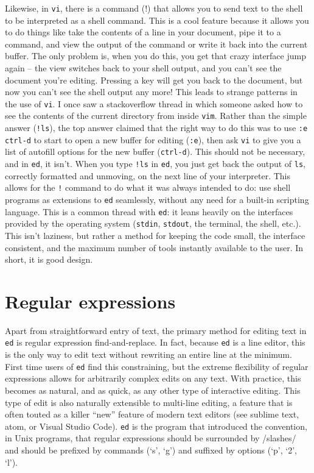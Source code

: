 \documentclass[12pt]{article}
\begin{document}
Likewise, in \lstinline{vi}, there is a command (!) that allows you
to send text to the shell to be interpreted as a shell command.
This is a cool feature because it allows you to do things like
take the contents of a line in your document, pipe it to a command,
and view the output of the command or write it back into the current buffer.
The only problem is, when you do this, you get that crazy interface jump
again -- the view switches back to your shell output, and you can't see
the document you're editing. Pressing a key will get you back to the document,
but now you can't see the shell output any more! This leads to strange
patterns in the use of \lstinline{vi}. I once saw a stackoverflow thread
in which someone asked how to see the contents of the current directory from
inside \lstinline{vim}. Rather than the simple answer (\lstinline{!ls}), the
top answer claimed that the right way to do this was to use \lstinline{:e ctrl-d}
to start to open a new buffer for editing (\lstinline{:e}), then ask \lstinline{vi}
to give you a list of autofill options for the new buffer (\lstinline{ctrl-d}).
This should not be necessary, and in \lstinline{ed}, it isn't. When you type
\lstinline{!ls} in \lstinline{ed}, you just get back 
the output of \lstinline{ls}, correctly formatted and unmoving, on the next
line of your interpreter. This allows for the \lstinline{!} command to do what
it was always intended to do: use shell programs as extensions to \lstinline{ed}
seamlessly, without any need for a built-in scripting language.
This is a common thread with \lstinline{ed}: it leans heavily on the interfaces provided
by the operating system (\lstinline{stdin}, \lstinline{stdout}, the terminal, the shell, etc.).
This isn't laziness, but rather a method for keeping the code small, the interface consistent,
and the maximum number of tools instantly available to the user. In short, it is good design.

\section{Regular expressions}

Apart from straightforward entry of text, the primary method
for editing text in \lstinline{ed} is regular expression
find-and-replace. In fact, because \lstinline{ed} is a line editor,
this is the only way to edit text without rewriting an entire line
at the minimum. First time users of \lstinline{ed} find this
constraining, but the extreme flexibility of regular expressions
allows for arbitrarily complex edits on any text. With practice,
this becomes as natural, and as quick, as any other type of interactive
editing. This type of edit is also naturally extensible to multi-line
editing, a feature that is often touted as a killer ``new'' feature of
modern text editors (see sublime text, atom, or Visual Studio Code).
\lstinline{ed} is the program that introduced the convention,
in Unix programs, that regular expressions should be surrounded
by /slashes/ and should be prefixed by commands (`s', `g') and suffixed
by options (`p', `2', `l').
\end{document}
